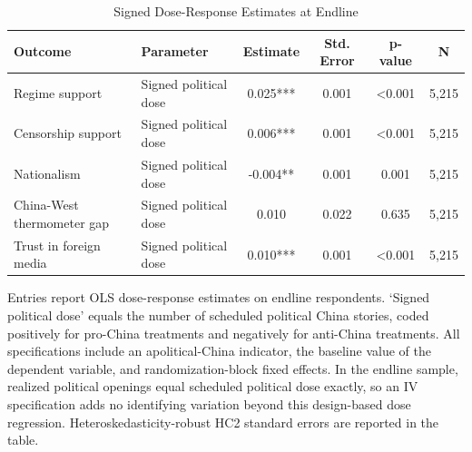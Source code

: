 \begin{table}[H]
\centering
\caption{Signed Dose-Response Estimates at Endline}
\label{tab:signed_dose_response_t1}
\footnotesize
\begin{threeparttable}
\begin{tabular}{llcccc}
\toprule
Outcome & Parameter & Estimate & Std. Error & p-value & N \\
\midrule
Regime support & Signed political dose & 0.025*** & 0.001 & <0.001 & 5,215 \\
Censorship support & Signed political dose & 0.006*** & 0.001 & <0.001 & 5,215 \\
Nationalism & Signed political dose & -0.004** & 0.001 & 0.001 & 5,215 \\
China-West thermometer gap & Signed political dose & 0.010 & 0.022 & 0.635 & 5,215 \\
Trust in foreign media & Signed political dose & 0.010*** & 0.001 & <0.001 & 5,215 \\
\bottomrule
\end{tabular}
\begin{tablenotes}[flushleft]
\footnotesize
\item Entries report OLS dose-response estimates on endline respondents. `Signed political dose' equals the number of scheduled political China stories, coded positively for pro-China treatments and negatively for anti-China treatments. All specifications include an apolitical-China indicator, the baseline value of the dependent variable, and randomization-block fixed effects. In the endline sample, realized political openings equal scheduled political dose exactly, so an IV specification adds no identifying variation beyond this design-based dose regression. Heteroskedasticity-robust HC2 standard errors are reported in the table.
\end{tablenotes}
\end{threeparttable}
\end{table}
